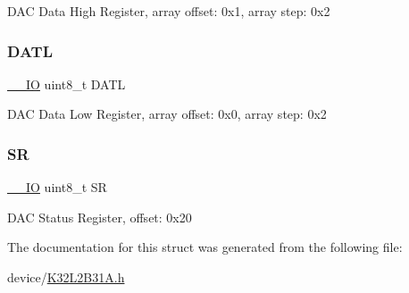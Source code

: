 D\+AC Data High Register, array offset\+: 0x1, array step\+: 0x2 \mbox{\label{struct_d_a_c___type_a2727b3fe1ebf5d8aa026f51a4857e293}} 
\subsubsection{\texorpdfstring{DATL}{DATL}}
{\footnotesize\ttfamily \mbox{\hyperlink{core__cm0plus_8h_aec43007d9998a0a0e01faede4133d6be}{\+\_\+\+\_\+\+IO}} uint8\+\_\+t D\+A\+TL}

D\+AC Data Low Register, array offset\+: 0x0, array step\+: 0x2 \mbox{\label{struct_d_a_c___type_a5634132d0d636b9eac05627fe9e2b2f9}} 
\subsubsection{\texorpdfstring{SR}{SR}}
{\footnotesize\ttfamily \mbox{\hyperlink{core__cm0plus_8h_aec43007d9998a0a0e01faede4133d6be}{\+\_\+\+\_\+\+IO}} uint8\+\_\+t SR}

D\+AC Status Register, offset\+: 0x20 

The documentation for this struct was generated from the following file\+:\begin{DoxyCompactItemize}
\item 
device/\mbox{\hyperlink{_k32_l2_b31_a_8h}{K32\+L2\+B31\+A.\+h}}\end{DoxyCompactItemize}
